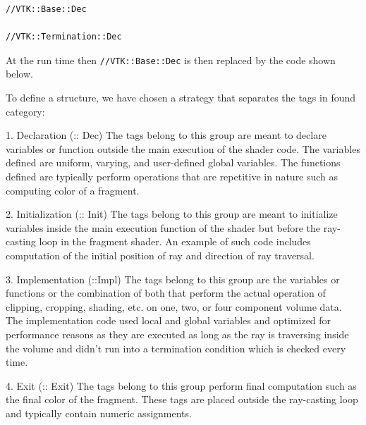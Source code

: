 \begin{lstlisting}
//VTK::Base::Dec

//VTK::Termination::Dec 
\end{lstlisting}

At the run time then \texttt{//VTK::Base::Dec} is then replaced by the code shown below. 

To define a structure, we have chosen a strategy that separates the tags in found category: 

1. Declaration (:: Dec)
The tags belong to this group are meant to declare variables or function outside the main execution of the shader code. The variables defined are uniform, varying, and user-defined global variables. The functions defined are typically perform operations that are repetitive in nature such as computing color of a fragment. 

2. Initialization (:: Init)
The tags belong to this group are meant to initialize variables inside the main execution function of the shader but before the ray-casting loop in the fragment shader. An example of such code includes computation of the initial position of ray and direction of ray traversal.

3. Implementation (::Impl)
The tags belong to this group are the variables or functions or the combination of both that perform the actual operation of clipping, cropping, shading, etc. on one, two, or four component volume data. The implementation code used local and global variables and optimized for performance reasons as they are executed as long as the ray is traversing inside the volume and didn't run into a termination condition which is checked every time.  

4. Exit (:: Exit)
The tags belong to this group perform final computation such as the final color of the fragment. These tags are placed outside the ray-casting loop and typically contain numeric assignments.

